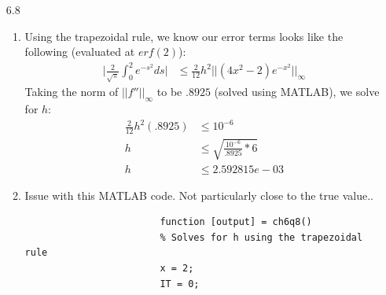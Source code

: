 \documentclass[11pt,a4paper]{article}
\begin{document}
\begin{itemize}
\begin{enumerate} [label={\alph*)}]
					\item We can use Simpson's rule to evaluate $u(1)$ since the number of intervals $n$ is even:
					\begin{align*}
					u(1) &= 0 + \frac{1}{4} \int_{0}^{1} T(s)ds\\
					u(1) &= 0 + \frac{1}{4} I_S \\
					u(1) &= 0 + \frac{1}{4}* \frac{1}{12}\Big((1)+4(-1)+2(2)+4(3)+(4)\Big)\\
					u(1) &= \frac{17}{48}
					\end{align*}
					\item If we use our result from part b we see $I_T = \frac{13}{8}$ and we use this in place of $I_T(2n)$. Following the theorem in the book we find that the Romberg Integration using the trapezoidal rule takes the form:
					$$\int_{a}^{b} f(x)dx = \frac{4}{3}I_T(2n)-\frac{1}{3}I_T(n)+O(h^3)$$
					Solving for $I_T(n)$ we get: 
					\begin{align*}
						I_T(n) &= \frac{1}{2}\Big(\frac{1}{2}(1) + (2) + \frac{1}{2}(4)\Big)\\
						I_T(n) &= \frac{9}{4}
					\end{align*}
					Putting it all together we see:
					\begin{align*}
						u(1) &= \frac{4}{3}(\frac{13}{8})-\frac{1}{3}(\frac{9}{4})\\
						u(1) &= \frac{17}{12}
					\end{align*}
					
				\end{enumerate}
				
			\item[6.8]
				\begin{enumerate} [label={\alph*)}]
					\item Using the trapezoidal rule, we know our error terms looks like the following (evaluated at $erf(2)$):
					\begin{align*}
						\Biggl \vert \frac{2}{\sqrt{\pi}} \int_{0}^{2}e^{-s^2}ds \Biggl\vert &\leq \frac{2}{12}h^2 \vert \vert (4x^2-2)e^{-x^2} \vert \vert_\infty
					\end{align*}
					Taking the norm of $\vert \vert f'' \vert \vert_\infty$ to be $.8925$ (solved using MATLAB), we solve for $h$:
					\begin{align*}
						\frac{2}{12}h^2 (.8925) &\leq 10^{-6}\\
						h &\leq \sqrt{\frac{10^{-6}}{.8925}*6} \\
						h &\leq  2.592815e-03
					\end{align*}
					\item Issue with this MATLAB code. Not particularly close to the true value..
							\begin{lstlisting}
						function [output] = ch6q8()
						% Solves for h using the trapezoidal rule
						x = 2;
						IT = 0;
						

\end{lstlisting}
\end{enumerate}
\end{itemize}
\end{document}
